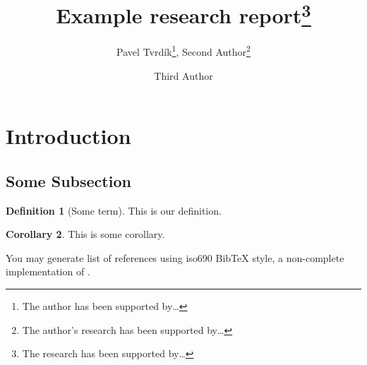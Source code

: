 \documentclass[english,technical,10pt]{FITreport}[2018/01/26]
\title{Example research report\thanks{The research has been supported by\dots}}
\author{Pavel Tvrd{\' i}k\thanks{The author has been supported by\dots}, Second Author\thanks{The author's research has been supported by\dots}\affil{Department of Computer Systems\\\theFIT}
	\and Third Author\affil{Another University}}
\begin{document}
\theoremstyle{definition}
\newtheorem{lemma}{Lemma}
\newtheorem{theorem}[lemma]{Theorem}
\newtheorem{definition}[lemma]{Definition}
\newtheorem{preposition}[lemma]{Preposition}
\newtheorem{example}[lemma]{Example}
\newtheorem{corollary}[lemma]{Corollary}
\newtheorem{proposition}[lemma]{Proposition}
\newtheorem{property}[lemma]{Property}
\newtheorem{observation}[lemma]{Observation}
\theoremstyle{remark}
\newtheorem{notation}[lemma]{Notation}
\newtheorem{note}[lemma]{Note}




\section{Introduction}

\subsection{Some Subsection}

\begin{definition}[Some term]
    This is our definition.
\end{definition}

\begin{corollary}
    This is some corollary.
\end{corollary}

You may generate list of references using iso690 Bib\TeX{} style, a non-complete implementation of \cite{iso690}.



    
\end{document}
